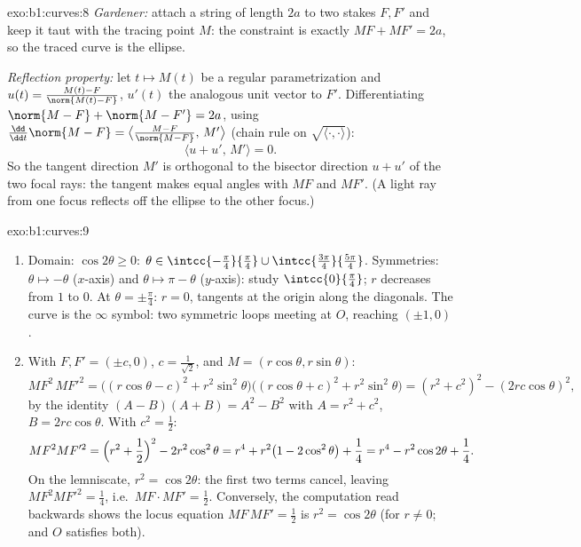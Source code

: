 \begin{solution}{exo:b1:curves:8}
\emph{Gardener:} attach a string of length $2a$ to two stakes $F,
F'$ and keep it taut with the tracing point $M$: the constraint is
exactly $MF + MF' = 2a$, so the traced curve is the ellipse.

\emph{Reflection property:} let $t \mapsto M(t)$ be a regular
parametrization and $u(t) = \frac{M(t) - F}{\norm{M(t) - F}}$,
$u'(t)$ the analogous unit vector to $F'$. Differentiating
$\norm{M - F} + \norm{M - F'} = 2a$, using $\frac{\dd}{\dd
t}\norm{M - F} = \bigl\langle \frac{M - F}{\norm{M-F}},\,
M'\bigr\rangle$ (chain rule on $\sqrt{\langle\cdot,\cdot\rangle}$):
\[
\bigl\langle u + u',\, M'\bigr\rangle = 0 .
\]
So the tangent direction $M'$ is orthogonal to the bisector
direction $u + u'$ of the two focal rays: the tangent makes equal
angles with $MF$ and $MF'$. (A light ray from one focus reflects
off the ellipse to the other focus.)
\end{solution}

\begin{solution}{exo:b1:curves:9}
\begin{enumerate}
  \item Domain: $\cos 2\theta \geq 0$: $\theta \in
        \intcc{-\frac\pi4}{\frac\pi4} \cup
        \intcc{\frac{3\pi}{4}}{\frac{5\pi}{4}}$. Symmetries: $\theta
        \mapsto -\theta$ ($x$-axis) and $\theta \mapsto \pi -
        \theta$ ($y$-axis): study $\intcc{0}{\frac\pi4}$; $r$
        decreases from $1$ to $0$. At $\theta = \pm\frac\pi4$: $r =
        0$, tangents at the origin along the diagonals. The curve is
        the $\infty$ symbol: two symmetric loops meeting at $O$,
        reaching $(\pm 1, 0)$.
  \item With $F, F' = (\pm c, 0)$, $c = \frac{1}{\sqrt 2}$, and $M
        = (r\cos\theta, r\sin\theta)$:
        \[
        MF^2\, MF'^2
        = \bigl((r\cos\theta - c)^2 + r^2\sin^2\theta\bigr)
        \bigl((r\cos\theta + c)^2 + r^2\sin^2\theta\bigr)
        = (r^2 + c^2)^2 - (2rc\cos\theta)^2 ,
        \]
        by the identity $(A - B)(A + B) = A^2 - B^2$ with $A = r^2
        + c^2$, $B = 2rc\cos\theta$. With $c^2 = \frac12$:
        \[
        MF^2 MF'^2 = \Bigl(r^2 + \frac12\Bigr)^2 - 2r^2\cos^2\theta
        = r^4 + r^2\bigl(1 - 2\cos^2\theta\bigr) + \frac14
        = r^4 - r^2\cos 2\theta + \frac14 .
        \]
        On the lemniscate, $r^2 = \cos 2\theta$: the first two terms
        cancel, leaving $MF^2MF'^2 = \frac14$, i.e.\ $MF \cdot MF' =
        \frac12$. Conversely, the computation read backwards shows
        the locus equation $MF\,MF' = \frac12$ is $r^2 = \cos
        2\theta$ (for $r \neq 0$; and $O$ satisfies both).
\end{enumerate}
\end{solution}

